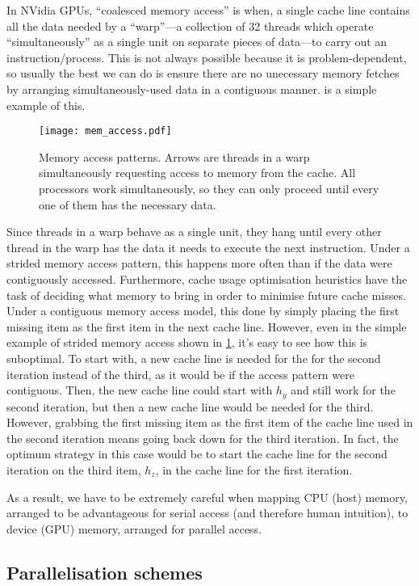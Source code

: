 In NVidia GPUs, ``coalesced memory access'' is when, a single cache line contains all the data needed by a ``warp''---a collection of 32 threads which operate ``simultaneously'' as a single unit on separate pieces of data---to carry out an instruction/process. This is not always possible because it is problem-dependent, so usually the best we can do is ensure there are no unecessary memory fetches by arranging simultaneously-used data in a contiguous manner.  is a simple example of this.
\begin{figure}
    \centering
    \texttt{[image: mem\_access.pdf]}
    \caption[Memory access patterns.]{Memory access patterns. Arrows are threads in a warp simultaneously requesting access to memory from the cache. All processors work simultaneously, so they can only proceed until every one of them has the necessary data.}
    \label{f:mem_access}
\end{figure}

Since threads in a warp behave as a single unit, they hang until every other thread in the warp has the data it needs to execute the next instruction. Under a strided memory access pattern, this happens more often than if the data were contiguously accessed. Furthermore, cache usage optimisation heuristics have the task of deciding what memory to bring in order to minimise future cache misses. Under a contiguous memory access model, this done by simply placing the first missing item as the first item in the next cache line. However, even in the simple example of strided memory access shown in \cref{f:mem_access}, it's easy to see how this is suboptimal. To start with, a new cache line is needed for the for the second iteration instead of the third, as it would be if the access pattern were contiguous. Then, the new cache line could start with $h_y$ and still work for the second iteration, but then a new cache line would be needed for the third. However, grabbing the first missing item as the first item of the cache line used in the second iteration means going back down for the third iteration. In fact, the optimum strategy in this case would be to start the cache line for the second iteration on the third item, $h_z$, in the cache line for the first iteration.

As a result, we have to be extremely careful when mapping CPU (host) memory, arranged to be advantageous for serial access (and therefore human intuition), to device (GPU) memory, arranged for parallel access.

\subsection{Parallelisation schemes}

